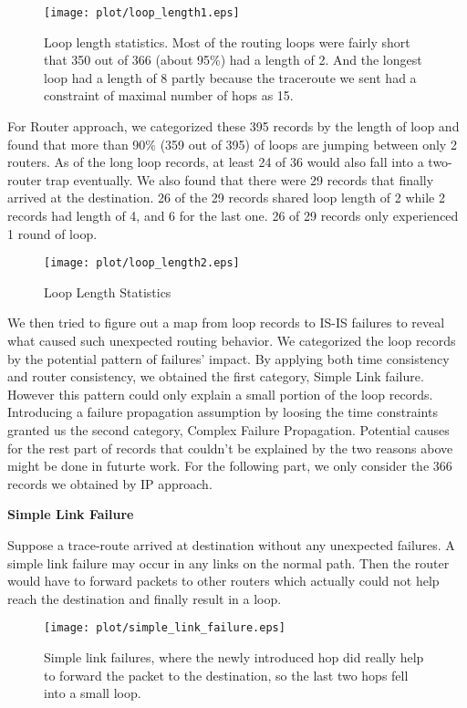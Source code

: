 \documentclass[conference, twocolumn, oneside, 10pt]{IEEEtran}
\begin{document}
\begin{figure}[h!]
\centering
\texttt{[image: plot/loop\_length1.eps]}
\caption{Loop length statistics. Most of the routing loops were fairly short that 350 out of 366 (about 95\%) had a length of 2. And the longest loop had a length of 8 partly because the traceroute we sent had a constraint of maximal number of hops as 15.}
\label{fig:asdf1}
\end{figure}

For Router approach, we categorized these 395 records by the length of loop and found that more than 90\% (359 out of 395) of loops are jumping between only 2 routers. As of the long loop records, at least 24 of 36 would also fall into a two-router trap eventually. We also found that there were 29 records that finally arrived at the destination. 26 of the 29 records shared loop length of 2 while 2 records had length of 4, and 6 for the last one. 26 of 29 records only experienced 1 round of loop.

\begin{figure}[h!]
\centering
\texttt{[image: plot/loop\_length2.eps]}
\caption{Loop Length Statistics}
\label{fig:asdf2}
\end{figure}

We then tried to figure out a map from loop records to IS-IS failures to reveal what caused such unexpected routing behavior. We categorized the loop records by the potential pattern of failures' impact. By applying both time consistency and router consistency, we obtained the first category, Simple Link failure. However this pattern could only explain a small portion of the loop records. Introducing a failure propagation assumption by loosing the time constraints granted us the second category, Complex Failure Propagation. Potential causes for the rest part of records that couldn't be explained by the two reasons above might be done in futurte work. For the following part, we only consider the 366 records we obtained by IP approach.

\textbf{Simple Link Failure}

Suppose a trace-route arrived at destination without any unexpected failures. A simple link failure may occur in any links on the normal path. Then the router would have to forward packets to other routers which actually could not help reach the destination and finally result in a loop.

\begin{figure}[h!]
\centering
\texttt{[image: plot/simple\_link\_failure.eps]}
\caption{Simple link failures, where the newly introduced hop did really help to forward the packet to the destination, so the last two hops fell into a small loop.}
\label{fig:asdf3}
\end{figure}
\end{document}
